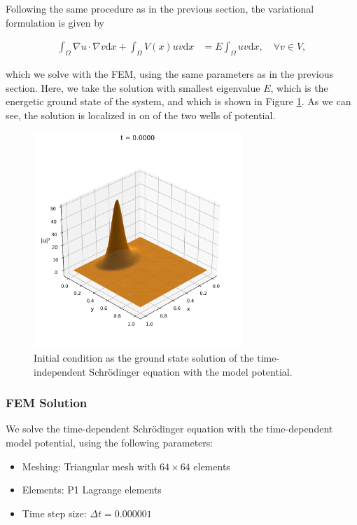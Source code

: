 \documentclass{article}
\theoremstyle{definition}
\theoremstyle{plain}
\theoremstyle{remark}
\begin{document}
Following the same procedure as in the previous section, the variational formulation is given by

\begin{align*}
  \int_{\Omega} \nabla u \cdot \nabla v \mathrm{d}x + \int_{\Omega} V(x) u v \mathrm{d}x &= E \int_{\Omega} u v \mathrm{d}x, \quad \forall v \in V,
\end{align*}

which we solve with the FEM, using the same parameters as in the previous section. Here, we take the solution with smallest eigenvalue $E$, which is the energetic ground state of the system, and which is shown in Figure \ref{fig:initial_state_with_potential}. As we can see, the solution is localized in on of the two wells of potential.

\begin{figure}[h]
  \centering
  \includegraphics[width=0.7\textwidth, trim=0cm 0cm 0cm 1cm, clip]{figures/potential_initial_state_3d.png}
  \caption{Initial condition as the ground state solution of the time-independent Schrödinger equation with the model potential.}
  \label{fig:initial_state_with_potential}
\end{figure}

\subsubsection*{FEM Solution}

We solve the time-dependent Schrödinger equation with the time-dependent model potential, using the following parameters:

\begin{itemize}
  \item Meshing: Triangular mesh with $64 \times 64$ elements
  \item Elements: P1 Lagrange elements
  \item Time step size: $\Delta t = 0.000001$
\end{itemize}
\end{document}
